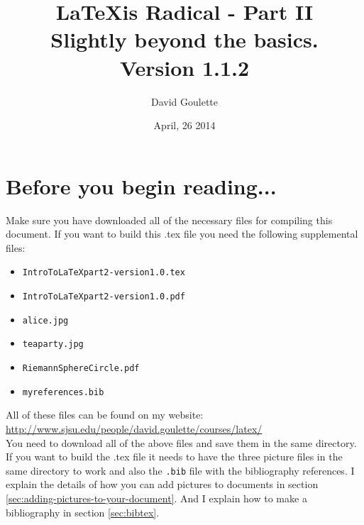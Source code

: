 \documentclass{article}
\author{David Goulette}
\date{April, 26 2014}
\title{\LaTeX\;is Radical - Part II \vspace{1mm}\\  {\large Slightly beyond the basics.\vspace{2mm}\\\normalsize Version 1.1.2}}
\newcommand{\nid}{\noindent} %
\begin{document}
 
\maketitle 

\tableofcontents
{}\label{listoffigures}
\listoffigures

\section{Before you begin reading...}
Make sure you have downloaded all of the necessary files for compiling this document.  If you want to build this .tex file you need the following supplemental files:
\begin{itemize}
\item \texttt{IntroToLaTeXpart2-version1.0.tex}
\item \texttt{IntroToLaTeXpart2-version1.0.pdf}
\item \texttt{alice.jpg}
\item \texttt{teaparty.jpg}
\item \texttt{RiemannSphereCircle.pdf}
\item \texttt{myreferences.bib}
\end{itemize}
All of these files can be found on my website:\\

\nid \url{http://www.sjsu.edu/people/david.goulette/courses/latex/}\\

You need to download all of the above files and save them in the same directory.  If you want to build the .tex file it needs to have the three picture files in the same directory to work and also the \verb|.bib| file with the bibliography references.  I explain the details of how you can add pictures to documents in section \ref{sec:adding-pictures-to-your-document}.  And I explain how to make a bibliography in section \ref{sec:bibtex}.
\end{document}
